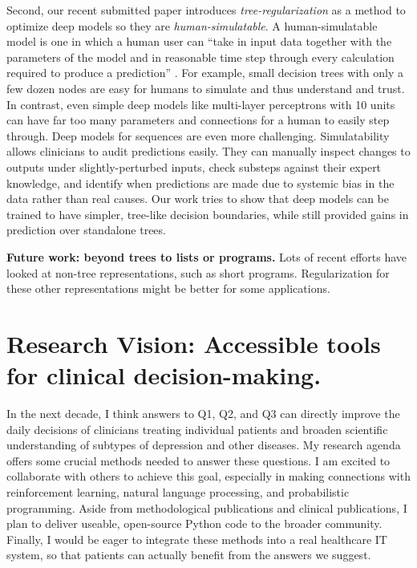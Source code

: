 \documentclass[11pt,letterpaper]{article}
\begin{document}
Second, our recent submitted paper \citep{wu2017treeregularization} introduces \emph{tree-regularization} as a method to optimize deep models so they are \emph{human-simulatable}.
A human-simulatable model is one in which a human user can ``take in
input data together with the parameters of the model and in reasonable
time step through every calculation required to produce a
prediction'' \cite{lipton2016interpretability}.  For example, small
decision trees with only a few dozen nodes are easy for
humans to simulate and thus understand and trust.  In contrast, even
simple deep models like multi-layer perceptrons with 10
units can have far too many parameters and connections for a human to easily step through.  Deep models for sequences are even more
challenging.  
Simulatability allows clinicians to
audit predictions easily.  They can manually inspect changes to
outputs under slightly-perturbed inputs, check substeps against their
expert knowledge, and identify when predictions are made due to
systemic bias in the data rather than real causes.
Our work tries to show that deep models can be trained to have simpler, tree-like decision boundaries, while still provided gains in prediction over standalone trees.

\textbf{Future work: beyond trees to lists or programs.}
Lots of recent efforts have looked at non-tree representations, such as short programs. Regularization for these other representations might be better for some applications.



\section{Research Vision: Accessible tools for clinical decision-making.}

In the next decade, I think answers to Q1, Q2, and Q3 can directly improve the daily decisions of clinicians treating individual patients and broaden scientific understanding of subtypes of depression and other diseases.
My research agenda offers some crucial methods needed to answer these questions.
I am excited to collaborate with others to achieve this goal, especially in making connections with reinforcement learning, natural language processing, and probabilistic programming.
Aside from methodological publications and clinical publications, 
I plan to deliver useable, open-source Python code to the broader community. Finally, I would be eager to integrate these methods into a real healthcare IT system, so that patients can actually benefit from the answers we suggest.
\end{document}
